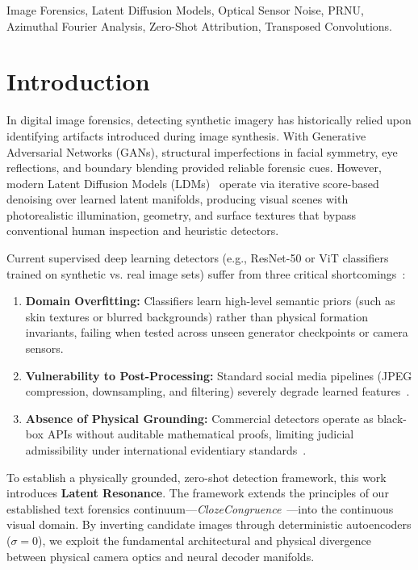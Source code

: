 \documentclass[conference]{IEEEtran}
\begin{document}
\begin{IEEEkeywords}
Image Forensics, Latent Diffusion Models, Optical Sensor Noise, PRNU, Azimuthal Fourier Analysis, Zero-Shot Attribution, Transposed Convolutions.
\end{IEEEkeywords}

\section{Introduction}
\label{sec:intro}

In digital image forensics, detecting synthetic imagery has historically relied upon identifying artifacts introduced during image synthesis. With Generative Adversarial Networks (GANs), structural imperfections in facial symmetry, eye reflections, and boundary blending provided reliable forensic cues. However, modern Latent Diffusion Models (LDMs)~\cite{rombach2022ldm} operate via iterative score-based denoising over learned latent manifolds, producing visual scenes with photorealistic illumination, geometry, and surface textures that bypass conventional human inspection and heuristic detectors.

Current supervised deep learning detectors (e.g., ResNet-50 or ViT classifiers trained on synthetic vs. real image sets) suffer from three critical shortcomings~\cite{wang2020cnn,ojha2023towards}:
\begin{enumerate}
    \item \textbf{Domain Overfitting:} Classifiers learn high-level semantic priors (such as skin textures or blurred backgrounds) rather than physical formation invariants, failing when tested across unseen generator checkpoints or camera sensors.
    \item \textbf{Vulnerability to Post-Processing:} Standard social media pipelines (JPEG compression, downsampling, and filtering) severely degrade learned features~\cite{corvi2023detection}.
    \item \textbf{Absence of Physical Grounding:} Commercial detectors operate as black-box APIs without auditable mathematical proofs, limiting judicial admissibility under international evidentiary standards~\cite{iso27037}.
\end{enumerate}

To establish a physically grounded, zero-shot detection framework, this work introduces \textbf{Latent Resonance}. The framework extends the principles of our established text forensics continuum---\textit{ClozeCongruence}~\cite{bandyopadhyay2026cloze1,bandyopadhyay2026dna,bandyopadhyay2026scaling,bandyopadhyay2026cloze3}---into the continuous visual domain. By inverting candidate images through deterministic autoencoders ($\sigma = 0$), we exploit the fundamental architectural and physical divergence between physical camera optics and neural decoder manifolds.
\end{document}
